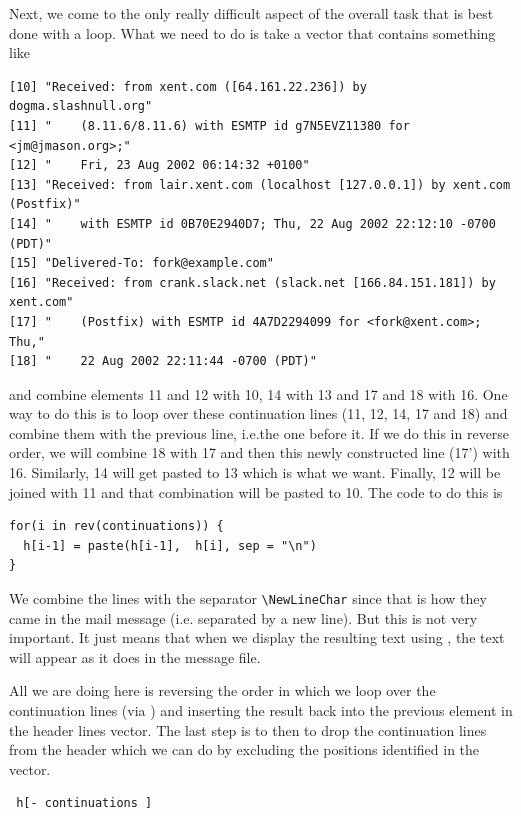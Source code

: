 Next, we come to the only really difficult aspect
of the overall task that is best done with a loop.
What we need to do is take a vector that contains
something like
{\footnotesize{
\begin{verbatim}
[10] "Received: from xent.com ([64.161.22.236]) by dogma.slashnull.org"                                         
[11] "    (8.11.6/8.11.6) with ESMTP id g7N5EVZ11380 for <jm@jmason.org>;"      
[12] "    Fri, 23 Aug 2002 06:14:32 +0100"                                      
[13] "Received: from lair.xent.com (localhost [127.0.0.1]) by xent.com (Postfix)"                               
[14] "    with ESMTP id 0B70E2940D7; Thu, 22 Aug 2002 22:12:10 -0700 (PDT)"     
[15] "Delivered-To: fork@example.com"                                           
[16] "Received: from crank.slack.net (slack.net [166.84.151.181]) by xent.com"  
[17] "    (Postfix) with ESMTP id 4A7D2294099 for <fork@xent.com>; Thu,"        
[18] "    22 Aug 2002 22:11:44 -0700 (PDT)"   
\end{verbatim}
}}
and combine elements 11 and 12 with 10,
14 with 13 and 17 and 18 with 16.
One way to do this is to loop over these
continuation lines (11, 12, 14, 17 and 18)
and combine them with the previous line,
i.e.the one before it.
If we do this in reverse order,
we will combine 18 with 17 and
then this newly constructed line (17')
with 16.
Similarly, 14 will get pasted to 13
which is what we want.
Finally, 12 will be joined with 11
and that combination will be pasted to 10.
The code to do this is
\begin{verbatim}
for(i in rev(continuations)) {
  h[i-1] = paste(h[i-1],  h[i], sep = "\n")
}
\end{verbatim}
We combine the lines with 
the separator \verb+\NewLineChar+ since that is how they 
came in the mail message (i.e. separated by a new line). 
But this is not very important.
It just means that when we display the resulting text
using ,  the text will appear
as it does in the message file.

All we are doing here is reversing the order in which we
loop over the continuation lines 
(via )
and inserting the result back into the previous element
in the header lines vector.
The last step is to then to drop the continuation lines
from the header which we can do by excluding the
positions identified in the
vector.
\begin{verbatim}
 h[- continuations ]
\end{verbatim}

